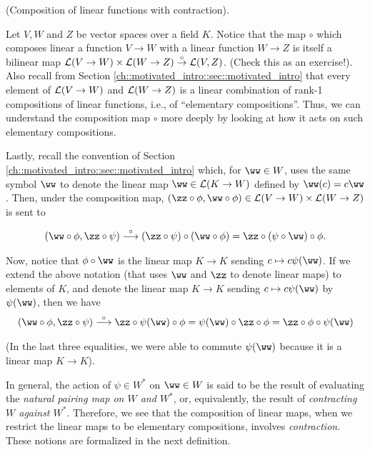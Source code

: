 \begin{deriv}
\label{ch::bilinear_forms_metric_tensors::deriv::compos_linear_map_with_contract}
    (Composition of linear functions with contraction). 
    
    Let $V, W$ and $Z$ be vector spaces over a field $K$. Notice that the map $\circ$ which composes linear a function $V \rightarrow W$ with a linear function $W \rightarrow Z$ is itself a bilinear map $\mathcal{L}(V \rightarrow W) \times \mathcal{L}(W \rightarrow Z) \overset{\circ}{\rightarrow} \mathcal{L}(V, Z)$. (Check this as an exercise!). Also recall from Section \ref{ch::motivated_intro::sec::motivated_intro} that every element of $\mathcal{L}(V \rightarrow W)$ and $\mathcal{L}(W \rightarrow Z)$ is a linear combination of rank-1 compositions of linear functions, i.e., of ``elementary compositions''. Thus, we can understand the composition map $\circ$ more deeply by looking at how it acts on such elementary compositions. 
    
    Lastly, recall the convention of Section \ref{ch::motivated_intro::sec::motivated_intro} which, for $\ww \in W$, uses the same symbol $\ww$ to denote the linear map $\ww \in \LLLL(K \rightarrow W)$ defined by $\ww(c) = c\ww$. Then, under the composition map, ${(\zz \circ \phi, \ww \circ \phi) \in \LLLL(V \rightarrow W) \times \LLLL(W \rightarrow Z)}$ is sent to
    
    \begin{align*}
        (\ww \circ \phi, \zz \circ \psi) \overset{\circ}{\longrightarrow} (\zz \circ \psi) \circ (\ww \circ \phi) = \zz \circ (\psi \circ \ww) \circ \phi.
    \end{align*}
    
    Now, notice that $\phi \circ \ww$ is the linear map $K \rightarrow K$ sending $c \mapsto c\psi(\ww)$. If we extend the above notation (that uses $\ww$ and $\zz$ to denote linear maps) to elements of $K$, and denote the linear map $K \rightarrow K$ sending $c \mapsto c\psi(\ww)$ by $\psi(\ww)$, then we have 
    \begin{align*}
        (\ww \circ \phi, \zz \circ \psi) \overset{\circ}{\longrightarrow} \zz \circ \psi(\ww) \circ \phi = \psi(\ww) \circ \zz \circ \phi = \zz \circ \phi \circ \psi(\ww)
    \end{align*}
    
    (In the last three equalities, we were able to commute $\psi(\ww)$ because it is a linear map $K \rightarrow K$).
    
    In general, the action of $\psi \in W^*$ on $\ww \in W$ is said to be the result of evaluating the \textit{natural pairing map on $W$ and $W^*$}, or, equivalently, the result of \textit{contracting $W$ against $W^*$}. Therefore, we see that the composition of linear maps, when we restrict the linear maps to be elementary compositions, involves \textit{contraction}. These notions are formalized in the next definition.
\end{deriv}

